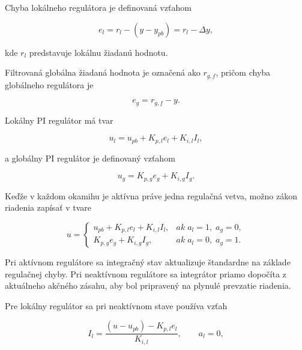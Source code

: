 Chyba lokálneho regulátora je definovaná vzťahom

\begin{equation}
e_l = r_l - \left( y - y_{pb} \right) = r_l - \Delta y,
\label{eq:pi_switch_local_error}
\end{equation}

kde $r_l$ predstavuje lokálnu žiadanú hodnotu.

Filtrovaná globálna žiadaná hodnota je označená ako $r_{g,f}$,
pričom chyba globálneho regulátora je

\begin{equation}
e_g = r_{g,f} - y.
\label{eq:pi_switch_global_error}
\end{equation}

Lokálny PI regulátor má tvar

\begin{equation}
u_l = u_{pb} + K_{p,l} e_l + K_{i,l} I_l,
\label{eq:pi_switch_local_control}
\end{equation} 

a globálny PI regulátor je definovaný vzťahom

\begin{equation}
u_g = K_{p,g} e_g + K_{i,g} I_g.
\label{eq:pi_switch_global_control}
\end{equation} 

Keďže v každom okamihu je aktívna práve jedna regulačná vetva,
možno zákon riadenia zapísať v tvare

\begin{equation}
u =
\begin{cases}
u_{pb} + K_{p,l} e_l + K_{i,l} I_l, & ak\; a_l = 1,\; a_g = 0, \\[1mm]
K_{p,g} e_g + K_{i,g} I_g, & ak\; a_l = 0,\; a_g = 1.
\end{cases}
\label{eq:pi_switch_total_control_cases}
\end{equation}

Pri aktívnom regulátore sa integračný stav aktualizuje štandardne
na základe regulačnej chyby.
Pri neaktívnom regulátore sa integrátor priamo dopočíta
z aktuálneho akčného zásahu,
aby bol pripravený na plynulé prevzatie riadenia.

Pre lokálny regulátor sa pri neaktívnom stave používa vzťah

\begin{equation}
I_l = \frac{(u-u_{pb}) - K_{p,l} e_l}{K_{i,l}},
\qquad a_l = 0,
\label{eq:pi_switch_local_tracking}
\end{equation}

